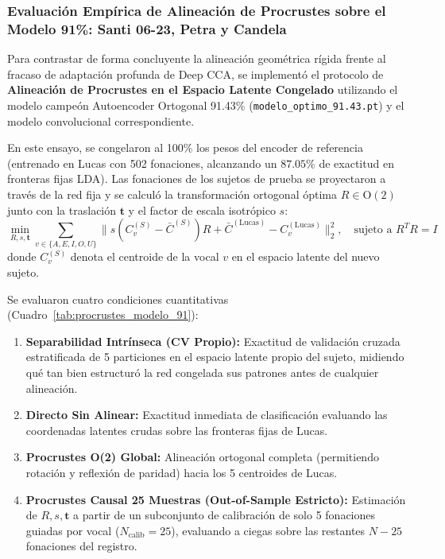 \documentclass[11pt,a4paper,openany]{book}
\theoremstyle{definition}
\begin{document}
\subsubsection{Evaluación Empírica de Alineación de Procrustes sobre el Modelo 91\%: Santi 06-23, Petra y Candela}
\label{subsubsec:evaluacion_procrustes_modelo_91}

Para contrastar de forma concluyente la alineación geométrica rígida frente al fracaso de adaptación profunda de Deep CCA, se implementó el protocolo de \textbf{Alineación de Procrustes en el Espacio Latente Congelado} utilizando el modelo campeón Autoencoder Ortogonal 91.43\% (\texttt{modelo\_optimo\_91.43.pt}) y el modelo convolucional correspondiente. 

En este ensayo, se congelaron al 100\% los pesos del encoder de referencia (entrenado en Lucas con 502 fonaciones, alcanzando un $87.05\%$ de exactitud en fronteras fijas LDA). Las fonaciones de los sujetos de prueba se proyectaron a través de la red fija y se calculó la transformación ortogonal óptima $R \in \text{O}(2)$ junto con la traslación $\mathbf{t}$ y el factor de escala isotrópico $s$:
\begin{equation}
    \min_{R, s, \mathbf{t}} \sum_{v \in \{A,E,I,O,U\}} \| s (C_v^{(S)} - \bar{C}^{(S)}) R + \bar{C}^{(\text{Lucas})} - C_v^{(\text{Lucas})} \|_2^2, \quad \text{sujeto a } R^T R = I
\end{equation}
donde $C_v^{(S)}$ denota el centroide de la vocal $v$ en el espacio latente del nuevo sujeto.

Se evaluaron cuatro condiciones cuantitativas (Cuadro~\ref{tab:procrustes_modelo_91}):
\begin{enumerate}
    \item \textbf{Separabilidad Intrínseca (CV Propio):} Exactitud de validación cruzada estratificada de 5 particiones en el espacio latente propio del sujeto, midiendo qué tan bien estructuró la red congelada sus patrones antes de cualquier alineación.
    \item \textbf{Directo Sin Alinear:} Exactitud inmediata de clasificación evaluando las coordenadas latentes crudas sobre las fronteras fijas de Lucas.
    \item \textbf{Procrustes O(2) Global:} Alineación ortogonal completa (permitiendo rotación y reflexión de paridad) hacia los 5 centroides de Lucas.
    \item \textbf{Procrustes Causal 25 Muestras (Out-of-Sample Estricto):} Estimación de $R, s, \mathbf{t}$ a partir de un subconjunto de calibración de solo 5 fonaciones guiadas por vocal ($N_{\text{calib}} = 25$), evaluando a ciegas sobre las restantes $N - 25$ fonaciones del registro.
\end{enumerate}
\end{document}

